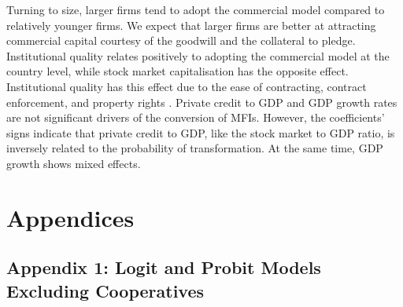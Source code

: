 \documentclass[a4paper,nobind]{templates/ociamthesis}
\begin{document}
Turning to size, larger firms tend to adopt the commercial model compared to relatively younger firms. We expect that larger firms are better at attracting commercial capital courtesy of the goodwill and the collateral to pledge. Institutional quality relates positively to adopting the commercial model at the country level, while stock market capitalisation has the opposite effect. Institutional quality has this effect due to the ease of contracting, contract enforcement, and property rights \autocite{claessens2003financial}. Private credit to GDP and GDP growth rates are not significant drivers of the conversion of MFIs. However, the coefficients' signs indicate that private credit to GDP, like the stock market to GDP ratio, is inversely related to the probability of transformation. At the same time, GDP growth shows mixed effects.

\hypertarget{appendices}{%
\section{Appendices}\label{appendices}}

\hypertarget{appendix-1-logit-and-probit-models-excluding-cooperatives}{%
\subsection{Appendix 1: Logit and Probit Models Excluding Cooperatives}\label{appendix-1-logit-and-probit-models-excluding-cooperatives}}
\end{document}
